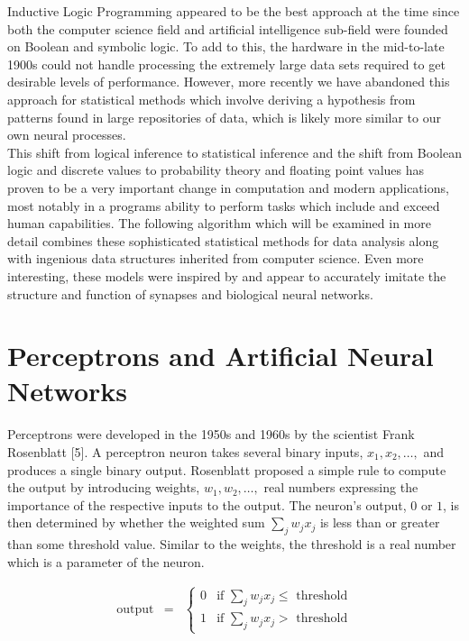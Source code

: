 \documentclass[12pt]{article}
\begin{document}
\noindent
Inductive Logic Programming appeared to be the best approach at the time since both the computer science field and artificial intelligence sub-field were founded on Boolean and symbolic logic. To add to this, the hardware in the mid-to-late 1900s could not handle processing the extremely large data sets required to get desirable levels of performance. However, more recently we have abandoned this approach for statistical methods which involve deriving a hypothesis from patterns found in large repositories of data, which is likely more similar to our own neural processes. 
\\

\noindent
This shift from logical inference to statistical inference and the shift from Boolean logic and discrete values to probability theory and floating point values has proven to be a very important change in computation and modern applications, most notably in a programs ability to perform tasks which include and exceed human capabilities. The following algorithm which will be examined in more detail combines these sophisticated statistical methods for data analysis along with ingenious data structures inherited from computer science. Even more interesting, these models were inspired by and appear to accurately imitate the structure and function of synapses and biological neural networks.


\section*{Perceptrons and Artificial Neural Networks}

Perceptrons were developed in the 1950s and 1960s by the scientist Frank Rosenblatt [5]. A perceptron neuron takes several binary inputs, $x_1, x_2, \dots,$ and produces a single binary output. Rosenblatt proposed a simple rule to compute the output by introducing weights, $w_1, w_2, \dots,$ real numbers expressing the importance of the respective inputs to the output. The neuron's output, $0$ or $1$, is then determined by whether the weighted sum $\sum_j w_j x_j$ is less than or greater than some threshold value. Similar to the weights, the threshold is a real number which is a parameter of the neuron.

\begin{eqnarray}
  \mbox{output} & = & \left\{ \begin{array}{ll}
      0 & \mbox{if } \sum_j w_j x_j \leq \mbox{ threshold} \\
      1 & \mbox{if } \sum_j w_j x_j > \mbox{ threshold}
      \end{array} \right.
\end{eqnarray}
\end{document}
